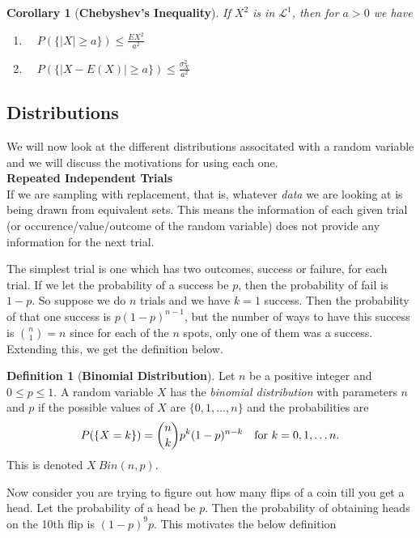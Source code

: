 \documentclass{article}
\newtheorem{corollary}{Corollary}[section]
\theoremstyle{definition}
\newtheorem{definition}{Definition}[section]
\theoremstyle{remark}
\begin{document}
\begin{corollary}[\textbf{Chebyshev's Inequality}]
If $X^2$ is in $\mathcal{L}^1$, then for $a>0$ we have
\begin{enumerate}
\item $ \quad P(\{|X| \geq a\}) \leq \frac{E{X^2}}{a^2}$
\item $ \quad P(\{|X - E(X)| \geq a\}) \leq \frac{\sigma^2_X}{a^2}$
\end{enumerate}

\end{corollary}





\subsection{Distributions}
We will now look at the different distributions associtated with a random variable
and we will discuss the motivations for using each one.\\
\textbf{Repeated Independent Trials}\\
If we are sampling with replacement, that is, whatever \textit{data} we are 
looking at is being drawn from equivalent sets. This means the information
of each given trial (or occurence/value/outcome of the random variable) does not provide
any information for the next trial.
\par The simplest trial is one which has two outcomes, success or failure, for each trial. If we let the 
probability of a success be $p$, then the probability of fail is $1-p$. So suppose we do $n$ trials
and we have $k=1$ success. Then the probability of that one success is $p(1-p)^{n-1}$, but the 
number of ways to have this success is $\binom{n}{1} = n$ since for each of the $n$ spots, only 
one of them was a success. Extending this, we get the definition below. 



\begin{definition}[\textbf{Binomial Distribution}]
Let $n$ be a positive integer and $ 0 \leq p \leq 1$. A random variable $X$ has the \textit{binomial distribution} with parameters
$n$ and $p$ if the possible values of $X$ are $\{0,1,\dots,n\}$ and the probabilities are 
\[
P(\{X=k\}) = \binom{n}{k}p^k(1-p)^{n-k} \quad \textnormal{for } k = 0,1,\dots n.
\]
This is denoted $X ~ Bin(n,p)$.

\end{definition}


\par Now consider you are trying to figure out how many flips of a coin 
till you get a head. Let the probability of a head be $p$. Then the probability 
of obtaining heads on the 10th flip is $(1-p)^{9}p$. This motivates the below definition
\end{document}
